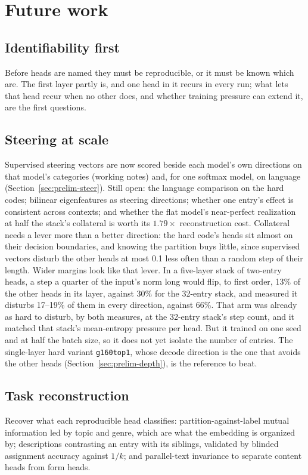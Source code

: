 \section{Future work}
\label{sec:future}

\subsection{Identifiability first}
Before heads are named they must be reproducible, or it must be known
which are. The first layer partly is, and one head in it recurs in every
run; what lets that head recur when no other does, and whether training
pressure can extend it, are the first questions.

\subsection{Steering at scale}
Supervised steering vectors are now scored beside each model's own
directions on that model's categories (working notes) and, for one
softmax model, on language (Section~\ref{sec:prelim-steer}). Still open:
the language comparison on the hard codes; bilinear eigenfeatures as
steering directions; whether one entry's effect is consistent across
contexts; and whether the flat model's near-perfect realization at half
the stack's collateral is worth its $1.79\times$ reconstruction cost.
Collateral needs a lever more than a better direction: the hard code's
heads sit almost on their decision boundaries, and knowing the partition
buys little, since supervised vectors disturb the other heads at most
0.1 less often than a random step of their length. Wider margins look
like that lever. In a five-layer stack of two-entry heads, a step a
quarter of the input's norm long would flip, to first order, 13\% of the
other heads in its layer, against 30\% for the 32-entry stack, and
measured it disturbs 17--19\% of them in every direction, against 66\%.
That arm was already as hard to disturb, by both measures, at the
32-entry stack's step count, and it matched that stack's mean-entropy
pressure per head. But it trained on one seed and at half the batch
size, so it does not yet isolate the number of entries. The single-layer hard variant
\texttt{g160top1}, whose decode direction is the one that avoids the
other heads (Section~\ref{sec:prelim-depth}), is the reference to beat.

\subsection{Task reconstruction}
Recover what each reproducible head classifies: partition-against-label
mutual information led by topic and genre, which are what the embedding
is organized by; descriptions contrasting an entry with its siblings,
validated by blinded assignment accuracy against $1/k$; and parallel-text
invariance to separate content heads from form heads.

